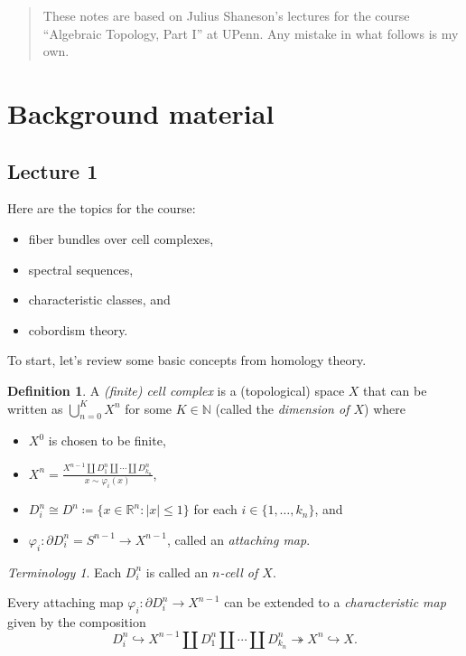 \documentclass[10pt,letterpaper,cm]{nupset}
\theoremstyle{definition}
\newtheorem{defn}{Definition}[subsection]
\theoremstyle{theorem}
\theoremstyle{remark}
\newtheorem*{term}{Terminology}
\newcommand{\N}{\mathbb N}
\newcommand{\R}{\mathbb{R}}
\newcommand{\1}{\mathbb{1}}
\newcommand{\0}{\vec 0}
\newcommand{\bi}{\begin{itemize}}
\newcommand{\ei}{\end{itemize}}
\begin{document}
\begin{abstract}
These notes are based on Julius Shaneson's lectures for the course ``Algebraic Topology, Part I'' at UPenn. Any mistake in what follows is my own.
\end{abstract}

\tableofcontents
\newpage

\section{Background material} 

\subsection{Lecture 1}

Here are the topics for the course:
\bi
\item fiber bundles over cell complexes,
\item spectral sequences,
\item characteristic classes, and
\item cobordism theory.
\ei

To start, let's review some basic concepts from homology theory.

\begin{defn}
A \textit{(finite) cell complex} is a (topological) space $X$ that can be written as $\bigcup_{n=0}^K{X^n}$ for some $K\in \N$ (called the \textit{dimension of $X$}) 
where 
\bi
\item$X^0$ is chosen to be finite, 
\item $X^n = \frac{X^{n-1}  \coprod D_1^n \coprod \cdots \coprod D_{k_n}^n}{x\sim \varphi_i(x)}$,
\item $D_i^n \cong D^n \coloneqq \{x \in \R^n : |x| \leq 1\}$ for each $i\in \{1, \ldots, k_n\}$, and 
\item $\varphi_i : \partial{D_i^n} = S^{n-1} \to X^{n-1}$, called an \textit{attaching map}.
\ei
\end{defn}

\begin{term}
Each $D_i^n$ is called an \textit{$n$-cell of $X$}.
\end{term}

Every attaching map $\varphi_i : \partial{D_i^n} \to X^{n-1}$ can be extended to a \textit{characteristic map} given by the composition  $$ D^n_i \hookrightarrow  X^{n-1}  \coprod D_1^n \coprod \cdots \coprod D_{k_n}^n \twoheadrightarrow X^n \hookrightarrow X     .$$
\end{document}
